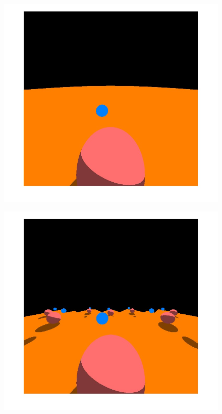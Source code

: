\documentclass[titlepage]{article}
\begin{document}
\begin{figure}[H]
\centering
\begin{minipage}[t]{.33\textwidth}
  \centering
  \includegraphics[width=1\linewidth]{Images/Euclidean.jpg}
  \label{fig:Evklidski prostor render}
\end{minipage}%
\begin{minipage}[t]{.33\textwidth}
  \centering
  \includegraphics[width=1\linewidth]{Images/Torus.jpg}

\end{minipage}
\end{figure}
\end{document}
